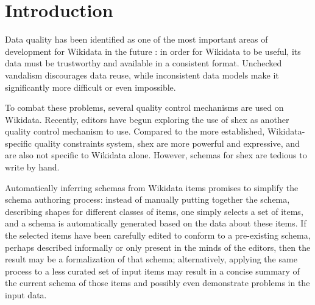 
\chapter{Introduction}
\label{ch:Introduction}

Data quality has been identified as one of the most important areas of development for Wikidata in the future \cite{wdcon2017-sotp}: %
in order for Wikidata to be useful,
its data must be trustworthy and available in a consistent format.
Unchecked vandalism discourages data reuse,
while inconsistent data models make it significantly more difficult or even impossible.

To combat these problems,
several quality control mechanisms are used on Wikidata.
Recently, editors have begun exploring the use of \acrlong{shex}
as another quality control mechanism to use.
Compared to the more established, Wikidata-specific quality constraints system,
\acrlong{shex} are more powerful and expressive,
and are also not specific to Wikidata alone.
However, schemas for \acrlong{shex} are tedious to write by hand.

Automatically inferring schemas from Wikidata items
promises to simplify the schema authoring process:
instead of manually putting together the schema,
describing shapes for different classes of items,
one simply selects a set of items,
and a schema is automatically generated based on the data about these items.
If the selected items have been carefully edited
to conform to a pre-existing schema,
perhaps described informally or only present in the minds of the editors,
then the result may be a formalization of that schema;
alternatively, applying the same process to a less curated set of input items
may result in a concise summary of the current schema of those items %
and possibly even demonstrate problems in the input data.

